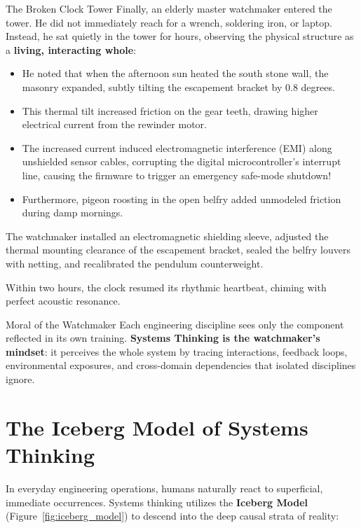 \begin{storybox}{The Broken Clock Tower}
Finally, an elderly master watchmaker entered the tower. He did not immediately reach for a wrench, soldering iron, or laptop. 
Instead, he sat quietly in the tower for hours, observing the physical structure as a \textbf{living, interacting whole}:
\begin{itemize}[leftmargin=1.5em]
    \item He noted that when the afternoon sun heated the south stone wall, the masonry expanded, subtly tilting the escapement bracket by 0.8 degrees.
    \item This thermal tilt increased friction on the gear teeth, drawing higher electrical current from the rewinder motor.
    \item The increased current induced electromagnetic interference (EMI) along unshielded sensor cables, corrupting the digital microcontroller's interrupt line, causing the firmware to trigger an emergency safe-mode shutdown!
    \item Furthermore, pigeon roosting in the open belfry added unmodeled friction during damp mornings.
\end{itemize}
The watchmaker installed an electromagnetic shielding sleeve, adjusted the thermal mounting clearance of the escapement bracket, sealed the belfry louvers with netting, and recalibrated the pendulum counterweight. 

Within two hours, the clock resumed its rhythmic heartbeat, chiming with perfect acoustic resonance.
\end{storybox}

\begin{takeawaybox}{Moral of the Watchmaker}
Each engineering discipline sees only the component reflected in its own training. 
\textbf{Systems Thinking is the watchmaker's mindset}: it perceives the whole system by tracing interactions, feedback loops, environmental exposures, and cross-domain dependencies that isolated disciplines ignore.
\end{takeawaybox}

\section{The Iceberg Model of Systems Thinking}
\label{sec:iceberg_model}

In everyday engineering operations, humans naturally react to superficial, immediate occurrences. Systems thinking utilizes the \textbf{Iceberg Model} (Figure~\ref{fig:iceberg_model}) to descend into the deep causal strata of reality:

